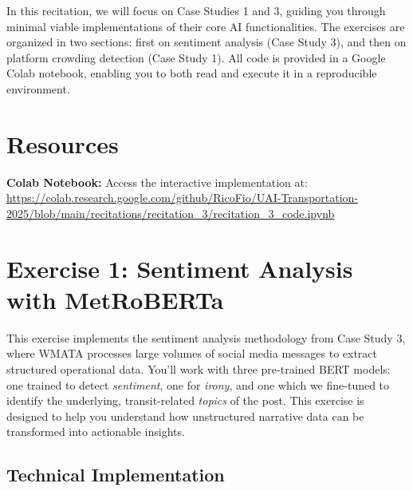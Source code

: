 \documentclass[11pt]{article}
\begin{document}
In this recitation, we will focus on Case Studies 1 and 3, guiding you through minimal viable implementations of their core AI functionalities. The exercises are organized in two sections: first on sentiment analysis (Case Study 3), and then on platform crowding detection (Case Study 1). All code is provided in a Google Colab notebook, enabling you to both read and execute it in a reproducible environment.

\section*{Resources}

\textbf{Colab Notebook:} Access the interactive implementation at:\\
\url{https://colab.research.google.com/github/RicoFio/UAI-Transportation-2025/blob/main/recitations/recitation_3/recitation_3_code.ipynb}

\section*{Exercise 1: Sentiment Analysis with MetRoBERTa}

\begin{center}
\end{center}

This exercise implements the sentiment analysis methodology from Case Study 3, where WMATA processes large volumes of social media messages to extract structured operational data. You'll work with three pre-trained BERT models: one trained to detect \textit{sentiment}, one for \textit{irony}, and one which we fine-tuned to identify the underlying, transit-related \textit{topics} of the post. This exercise is designed to help you understand how unstructured narrative data can be transformed into actionable insights.

\subsection*{Technical Implementation}
\end{document}
